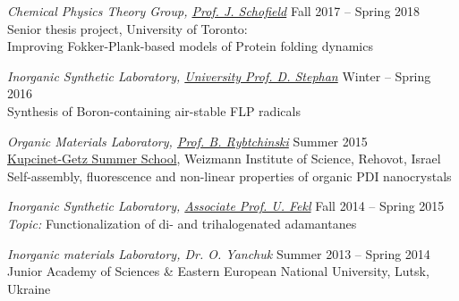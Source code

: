 \documentclass[9pt, margin]{res}
\begin{document}
\begin{resume}
{\sl Chemical Physics Theory Group, \href{http://www.chem.utoronto.ca/~jmschofi/}{Prof. J. Schofield}} \hfill Fall 2017 -- Spring 2018 \\
Senior thesis project, University of Toronto:\\
Improving Fokker-Plank-based models of Protein folding dynamics
 
{\sl Inorganic Synthetic Laboratory, \href{http://www.chem.utoronto.ca/staff/DSTEPHAN/index.htm}{University Prof. D. Stephan}} \hfill Winter -- Spring 2016 \\
Synthesis of Boron-containing air-stable FLP radicals

{\sl Organic Materials Laboratory, \href{https://www.weizmann.ac.il/Organic_Chemistry/Rybtchinski/}{Prof. B. Rybtchinski}} \hfill Summer 2015 \\
\href{https://www.weizmann.ac.il/feinberg/admissions/kupcinet-getz-international-Summer-school/about-program-0}{Kupcinet-Getz Summer School}, Weizmann Institute of Science, Rehovot, Israel\\
Self-assembly, fluorescence and non-linear properties of organic PDI nanocrystals

{\sl Inorganic Synthetic Laboratory, \href{http://www.utm.utoronto.ca/fekl/}{Associate Prof. U. Fekl}} \hfill Fall 2014 -- Spring 2015 \\
\textit{Topic:} Functionalization of di- and trihalogenated adamantanes

{\sl Inorganic materials Laboratory, Dr. O. Yanchuk} \hfill Summer 2013 -- Spring 2014 \\
Junior Academy of Sciences \& Eastern European National University, Lutsk, Ukraine\\

\begin{comment}
\section{PUBLICATIONS}
\begin{itemize}
	\item \textbf{Korol, R.}; Bou-Rabee,  N.; Miller III, T.F. Cayley modification for strongly stable path-integral and ring-polymer molecular dynamics. \textit{J. Chem. Phys.} \textbf{2019}, 151 (12), 124103. \href{https://aip.scitation.org/doi/10.1063/1.5120282}{10.1063/1.5120282}

	\item \textbf{Korol, R.}; Segal, D. Machine Learning Prediction of DNA Charge Transport. \textit{J. Phys. Chem. B} \textbf{2019}, 123 (13), pp 2801 –- 2811. \href{https://pubs.acs.org/doi/full/10.1021/acs.jpcb.8b12557}{10.1021/acs.jpcb.8b12557}


\end{comment}
\end{resume}
\end{document}

